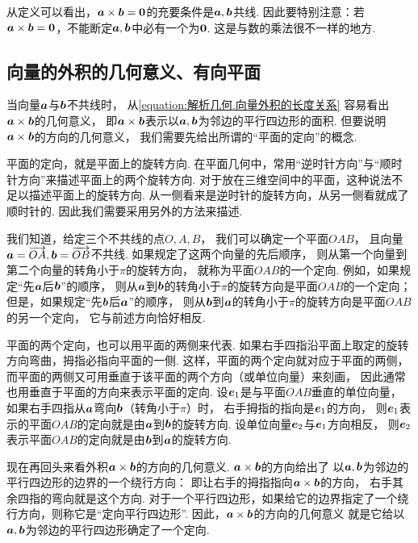 从定义可以看出，\(\boldsymbol{a}\times\boldsymbol{b}=\boldsymbol{0}\)的充要条件是\(\boldsymbol{a},\boldsymbol{b}\)共线.
因此要特别注意：若\(\boldsymbol{a}\times\boldsymbol{b}=\boldsymbol{0}\)，不能断定\(\boldsymbol{a},\boldsymbol{b}\)中必有一个为\(\boldsymbol{0}\).
这是与数的乘法很不一样的地方.

\subsection{向量的外积的几何意义、有向平面}
当向量\(\boldsymbol{a}\)与\(\boldsymbol{b}\)不共线时，
从\cref{equation:解析几何.向量外积的长度关系} 容易看出\(\boldsymbol{a}\times\boldsymbol{b}\)的几何意义，
即\(\boldsymbol{a}\times\boldsymbol{b}\)表示以\(\boldsymbol{a},\boldsymbol{b}\)为邻边的平行四边形的面积.
但要说明\(\boldsymbol{a}\times\boldsymbol{b}\)的方向的几何意义，
我们需要先给出所谓的“平面的定向”的概念.

平面的定向，就是平面上的旋转方向.
在平面几何中，常用“逆时针方向”与“顺时针方向”来描述平面上的两个旋转方向.
对于放在三维空间中的平面，这种说法不足以描述平面上的旋转方向.
从一侧看来是逆时针的旋转方向，从另一侧看就成了顺时针的.
因此我们需要采用另外的方法来描述.

我们知道，给定三个不共线的点\(O,A,B\)，
我们可以确定一个平面\(OAB\)，
且向量\(\boldsymbol{a}=\overrightarrow{OA},
\boldsymbol{b}=\overrightarrow{OB}\)不共线.
如果规定了这两个向量的先后顺序，
则从第一个向量到第二个向量的转角小于\(\pi\)的旋转方向，
就称为平面\(OAB\)的一个定向.
例如，如果规定“先\(\boldsymbol{a}\)后\(\boldsymbol{b}\)”的顺序，
则从\(\boldsymbol{a}\)到\(\boldsymbol{b}\)的转角小于\(\pi\)的旋转方向是平面\(OAB\)的一个定向；
但是，如果规定“先\(\boldsymbol{b}\)后\(\boldsymbol{a}\)”的顺序，
则从\(\boldsymbol{b}\)到\(\boldsymbol{a}\)的转角小于\(\pi\)的旋转方向是平面\(OAB\)的另一个定向，
它与前述方向恰好相反.

平面的两个定向，也可以用平面的两侧来代表.
如果右手四指沿平面上取定的旋转方向弯曲，拇指必指向平面的一侧.
这样，平面的两个定向就对应于平面的两侧，
而平面的两侧又可用垂直于该平面的两个方向（或单位向量）来刻画，
因此通常也用垂直于平面的方向来表示平面的定向.
设\(\boldsymbol{e}_1\)是与平面\(OAB\)垂直的单位向量，
如果右手四指从\(\boldsymbol{a}\)弯向\(\boldsymbol{b}\)（转角小于\(\pi\)）时，
右手拇指的指向是\(\boldsymbol{e}_1\)的方向，
则\(\boldsymbol{e}_1\)表示的平面\(OAB\)的定向就是由\(\boldsymbol{a}\)到\(\boldsymbol{b}\)的旋转方向.
设单位向量\(\boldsymbol{e}_2\)与\(\boldsymbol{e}_1\)方向相反，
则\(\boldsymbol{e}_2\)表示平面\(OAB\)的定向就是由\(\boldsymbol{b}\)到\(\boldsymbol{a}\)的旋转方向.

现在再回头来看外积\(\boldsymbol{a}\times\boldsymbol{b}\)的方向的几何意义.
\(\boldsymbol{a}\times\boldsymbol{b}\)的方向给出了
以\(\boldsymbol{a},\boldsymbol{b}\)为邻边的平行四边形的边界的一个绕行方向：
即让右手的拇指指向\(\boldsymbol{a}\times\boldsymbol{b}\)的方向，
右手其余四指的弯向就是这个方向.
对于一个平行四边形，如果给它的边界指定了一个绕行方向，则称它是“定向平行四边形”.
因此，\(\boldsymbol{a}\times\boldsymbol{b}\)的方向的几何意义
就是它给以\(\boldsymbol{a},\boldsymbol{b}\)为邻边的平行四边形确定了一个定向.

